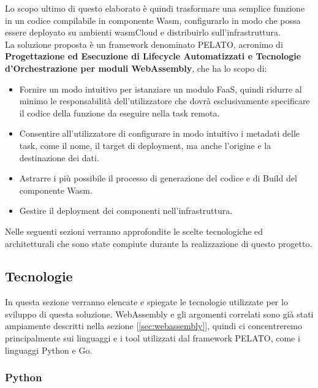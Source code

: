 Lo scopo ultimo di questo elaborato è quindi trasformare una semplice funzione in un codice compilabile in componente Wasm, configurarlo in modo che possa essere deployato su ambienti wasmCloud e distribuirlo sull'infrastruttura.\\
La soluzione proposta è un framework denominato PELATO, acronimo di \textbf{Progettazione ed Esecuzione di Lifecycle Automatizzati e Tecnologie d'Orchestrazione per moduli WebAssembly}, che ha lo scopo di:

\begin{itemize}
    \item Fornire un modo intuitivo per istanziare un modulo FaaS, quindi ridurre al minimo le responsabilità dell'utilizzatore che dovrà esclusivamente specificare il codice della funzione da eseguire nella task remota.
    \item Consentire all'utilizzatore di configurare in modo intuitivo i metadati delle task, come il nome, il target di deployment, ma anche l'origine e la destinazione dei dati.
    \item Astrarre i più possibile il processo di generazione del codice e di Build del componente Wasm.
    \item Gestire il deployment dei componenti nell'infrastruttura.
\end{itemize}

Nelle seguenti sezioni verranno approfondite le scelte tecnologiche ed architetturali che sono state compiute durante la realizzazione di questo progetto.

\subsection{Tecnologie}

In questa sezione verranno elencate e spiegate le tecnologie utilizzate per lo sviluppo di questa soluzione. WebAssembly e gli argomenti correlati sono già stati ampiamente descritti nella sezione [\ref{sec:webassembly}], quindi ci concentreremo principalmente sui linguaggi e i tool utilizzati dal framework PELATO, come i linguaggi Python e Go.

\subsubsection{Python}

